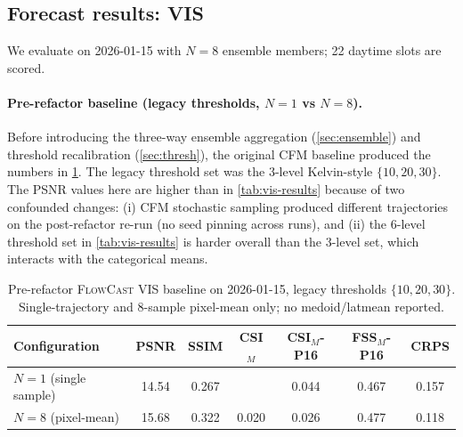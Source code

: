 \documentclass[11pt,a4paper]{article}
\begin{document}
\subsection{Forecast results: VIS}
\label{sec:vis-results}
We evaluate on 2026-01-15 with $N=8$ ensemble members; 22 daytime slots
are scored.

\paragraph{Pre-refactor baseline (legacy thresholds, $N=1$ vs $N=8$).}
Before introducing the three-way ensemble aggregation
(\cref{sec:ensemble}) and threshold recalibration (\cref{sec:thresh}), the
original CFM baseline produced the numbers in \cref{tab:vis-prerefactor}.
The legacy threshold set was the 3-level Kelvin-style $\{10, 20, 30\}$.
The PSNR values here are higher than in \cref{tab:vis-results} because of
two confounded changes: (i) CFM stochastic sampling produced different
trajectories on the post-refactor re-run (no seed pinning across runs),
and (ii) the 6-level threshold set in \cref{tab:vis-results} is harder
overall than the 3-level set, which interacts with the categorical means.

\begin{table}[h]
\centering\small
\caption{Pre-refactor \textsc{FlowCast} VIS baseline on 2026-01-15,
legacy thresholds $\{10, 20, 30\}$. Single-trajectory and 8-sample
pixel-mean only; no medoid/latmean reported.}
\label{tab:vis-prerefactor}
\begin{tabular}{l|cccccc}
\toprule
Configuration & PSNR & SSIM & CSI$_M$ & CSI$_M$-P16 & FSS$_M$-P16 & CRPS \\
\midrule
$N=1$ (single sample)            & 14.54 & 0.267 &     & 0.044 & 0.467 & 0.157 \\
$N=8$ (pixel-mean)               & 15.68 & 0.322 & 0.020  & 0.026 & 0.477 & 0.118 \\
\bottomrule
\end{tabular}
\end{table}
\end{document}
